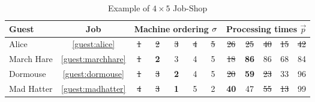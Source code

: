 \begin{table}[t!]\centering
\caption{Example of $4\times5$ Job-Shop}\label{tbl:example}
\begin{tabular}{lc|ccccc|ccccc} \toprule
Guest & \multicolumn{1}{c}{Job} & \multicolumn{5}{c}{Machine ordering 
${\mathbf{\sigma}}$} & \multicolumn{5}{c}{Processing times $\vec{p}$} \\ \midrule
Alice & \ref{guest:alice} & \st{1} & \st{2} & \st{3} & \st{4} & 
\st{5} & 
\st{26} & \st{25} & \st{40} & \st{15} & \st{42} \\
March Hare & \ref{guest:marchhare} & \st{1} & \textbf{2} & 3 & 4 & 5 & 
\st{18} & \textbf{86} & 86 & 68 & 84 \\
Dormouse & \ref{guest:dormouse} & \st{1} & \st{3} & \textbf{2} & 4 & 5 
& 
\st{20} & \textbf{59} & \st{23} & 33 & 96 \\
Mad Hatter & \ref{guest:madhatter} & \st{4} & \st{3} & \textbf{1} & 5 & 
2 & \textbf{40} & 47 & \st{55} & \st{13} & 99 
\\
\bottomrule
\end{tabular}
\end{table}